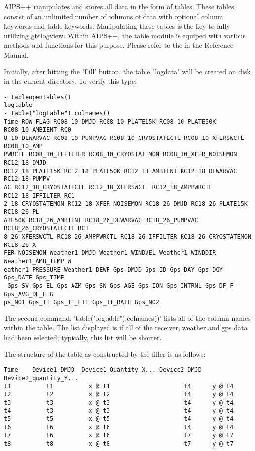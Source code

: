 AIPS++ manipulates and stores all data in the form of tables. These tables 
consist of an unlimited number of columns of data with optional column
keywords and table keywords. Manipulating these tables is the key to
fully utilizing gbtlogview. Within AIPS++, the table module is equiped
with various methods and functions for this purpose.
Please refer to the 
 in the Reference Manual.

Initially, after hitting the 'Fill' button, the table "logdata" will be
created on disk in the current directory. To verify this type:

\begin{verbatim}
- tableopentables()
logtable
- table("logtable").colnames()
Time ROW_FLAG RC08_10_DMJD RC08_10_PLATE15K RC08_10_PLATE50K RC08_10_AMBIENT RC0
8_10_DEWARVAC RC08_10_PUMPVAC RC08_10_CRYOSTATECTL RC08_10_XFERSWCTL RC08_10_AMP
PWRCTL RC08_10_IFFILTER RC08_10_CRYOSTATEMON RC08_10_XFER_NOISEMON RC12_18_DMJD
RC12_18_PLATE15K RC12_18_PLATE50K RC12_18_AMBIENT RC12_18_DEWARVAC RC12_18_PUMPV
AC RC12_18_CRYOSTATECTL RC12_18_XFERSWCTL RC12_18_AMPPWRCTL RC12_18_IFFILTER RC1
2_18_CRYOSTATEMON RC12_18_XFER_NOISEMON RC18_26_DMJD RC18_26_PLATE15K RC18_26_PL
ATE50K RC18_26_AMBIENT RC18_26_DEWARVAC RC18_26_PUMPVAC RC18_26_CRYOSTATECTL RC1
8_26_XFERSWCTL RC18_26_AMPPWRCTL RC18_26_IFFILTER RC18_26_CRYOSTATEMON RC18_26_X
FER_NOISEMON Weather1_DMJD Weather1_WINDVEL Weather1_WINDDIR Weather1_AMB_TEMP W
eather1_PRESSURE Weather1_DEWP Gps_DMJD Gps_ID Gps_DAY Gps_DOY Gps_DATE Gps_TIME
 Gps_SV Gps_EL Gps_AZM Gps_SN Gps_AGE Gps_ION Gps_INTRNL Gps_DF_F Gps_AVG_DF_F G
ps_NO1 Gps_TI Gps_TI_FIT Gps_TI_RATE Gps_NO2
\end{verbatim}

The second command, 'table("logtable").colnames()' lists all of the column
names within the table. The list displayed is if all of the receiver, weather
and gps data had been selected; typically, this list will be shorter.

The structure of the table as constructed by the filler is as follows:
\begin{verbatim}
Time    Device1_DMJD  Device1_Quantity_X... Device2_DMJD Device2_quantity_Y...
t1          t1          x @ t1                     t4      y @ t4
t2          t2          x @ t2                     t4      y @ t4
t3          t3          x @ t3                     t4      y @ t4
t4          t3          x @ t3                     t4      y @ t4
t5          t5          x @ t5                     t4      y @ t4
t6          t6          x @ t6                     t4      y @ t4
t7          t6          x @ t6                     t7      y @ t7
t8          t8          x @ t8                     t7      y @ t7
\end{verbatim}

